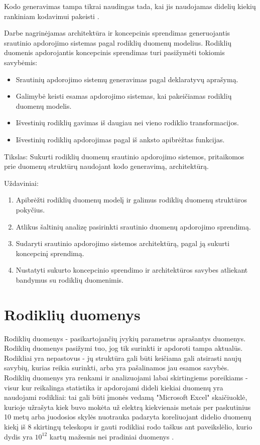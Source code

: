 \documentclass{VUMIFPSbakalaurinis}
\begin{document}
Kodo generavimas tampa tikrai naudingas tada, kai jis naudojamas didelių kiekių rankiniam kodavimui pakeisti \cite{herrington2003code}. \par
Darbe nagrinėjamas architektūra ir koncepcinis sprendimas generuojantis srautinio apdorojimo sistemas pagal rodiklių duomenų modelius. Rodiklių duomenis apdorojantis koncepcinis sprendimas turi pasižymėti tokiomis savybėmis: 
\begin{itemize}
    \item Srautinių apdorojimo sistemų generavimas pagal deklaratyvų aprašymą.
    \item Galimybė keisti esamas apdorojimo sistemas, kai pakeičiamas rodiklių duomenų modelis.
    \item Išvestinių rodiklių gavimas iš daugiau nei vieno rodiklio transformacijos.
    \item Išvestinių rodiklių apdorojimas pagal iš anksto apibrėžtas funkcijas.
\end{itemize}  

Tikslas: Sukurti rodiklių duomenų srautinio apdorojimo sistemos, pritaikomos prie duomenų struktūrų naudojant kodo generavimą, architektūrą.

Uždaviniai:
\begin{enumerate}
    \item Apibrėžti rodiklių duomenų modelį ir galimus rodiklių duomenų struktūros pokyčius.
    \item Atlikus šaltinių analizę pasirinkti srautinio duomenų apdorojimo sprendimą.
    \item Sudaryti srautinio apdorojimo sistemos architektūrą, pagal ją sukurti koncepcinį sprendimą. 
    \item Nustatyti sukurto koncepcinio sprendimo ir architektūros savybes atliekant bandymus su rodiklių duomenimis.
\end{enumerate}

\section{Rodiklių duomenys}

Rodiklių duomenys - pasikartojančių įvykių parametrus aprašantys duomenys. Rodiklių duomenys pasižymi tuo, jog tik surinkti ir apdoroti tampa aktualūs. Rodikliai yra nepastovus - jų struktūra gali būti keičiama gali atsirasti naujų savybių, kurias reikia surinkti, arba yra pašalinamos jau esamos savybės. Rodiklių duomenys yra renkami ir analizuojami labai skirtingiems poreikiams - visur kur reikalinga statistika ir apdorojami dideli kiekiai duomenų yra naudojami rodikliai: tai gali būti įmonės vedamą "Microsoft Excel" skaičiuoklė, kurioje užrašyta kiek buvo mokėta už elektrą kiekvienais metais per paskutinius 10 metų arba juodosios skylės nuotrauka padaryta koreliuojant didelio duomenų kiekį iš 8 skirtingų teleskopu ir gauti rodikliai rodo taškus ant paveikslėlio, kurio dydis yra \(10^{12}\) kartų mažesnis nei pradiniai duomenys \cite{akiyama2019first}.
\end{document}
